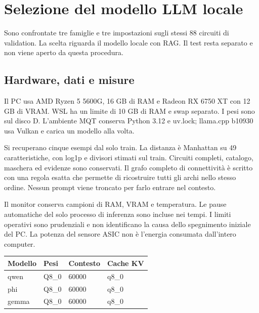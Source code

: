 \providecommand{\ValidationFiguresPath}{figures/}

\section{Selezione del modello LLM locale}

Sono confrontate tre famiglie e tre impostazioni sugli stessi 88 circuiti di validation. La scelta riguarda il modello locale con RAG. Il test resta separato e non viene aperto da questa procedura.

\subsection{Hardware, dati e misure}

Il PC usa AMD Ryzen 5 5600G, 16 GB di RAM e Radeon RX 6750 XT con 12 GB di VRAM. WSL ha un limite di 10 GB di RAM e swap separato. I pesi sono sul disco D. L'ambiente MQT conserva Python 3.12 e uv.lock; llama.cpp b10930 usa Vulkan e carica un modello alla volta.

Si recuperano cinque esempi dal solo train. La distanza è Manhattan su 49 caratteristiche, con log1p e divisori stimati sul train. Circuiti completi, catalogo, maschera ed evidenze sono conservati. Il grafo completo di connettività è scritto con una regola esatta che permette di ricostruire tutti gli archi nello stesso ordine. Nessun prompt viene troncato per farlo entrare nel contesto.

Il monitor conserva campioni di RAM, VRAM e temperatura. Le pause automatiche del solo processo di inferenza sono incluse nei tempi. I limiti operativi sono prudenziali e non identificano la causa dello spegnimento iniziale del PC. La potenza del sensore ASIC non è l'energia consumata dall'intero computer.

\begin{center}\begin{tabular}{llll}\toprule Modello & Pesi & Contesto & Cache KV\\\midrule

qwen & Q8\_0 & 60000 & q8\_0\\

phi & Q8\_0 & 60000 & q8\_0\\

gemma & Q8\_0 & 60000 & q8\_0\\

\bottomrule\end{tabular}\end{center}


